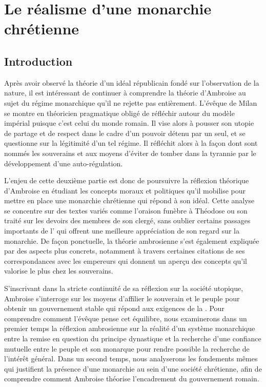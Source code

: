 \section{Le réalisme d'une monarchie chrétienne}

\subsection*{Introduction}

Après avoir observé la théorie d'un idéal républicain fondé sur l'observation de la nature, il est intéressant de continuer à comprendre la théorie d'Ambroise au sujet du régime monarchique qu'il ne rejette pas entièrement. L'évêque de Milan se montre en théoricien pragmatique obligé de réfléchir autour du modèle impérial puisque c'est celui du monde romain. Il vise alors à pousser son utopie de partage et de respect dans le cadre d'un pouvoir détenu par un seul, et se questionne sur la légitimité d'un tel régime. Il réfléchit alors à la façon dont sont nommés les souverains et aux moyens d'éviter de tomber dans la tyrannie par le développement d'une auto-régulation.

\bigskip

L'enjeu de cette deuxième partie est donc de poursuivre la réflexion théorique d'Ambroise en étudiant les concepts moraux et politiques qu'il mobilise pour mettre en place une monarchie chrétienne qui répond à son idéal. Cette analyse se concentre sur des textes variés comme l'oraison funèbre à Théodose ou son traité  sur les devoirs des membres de son clergé, sans oublier certains passages importants de l' qui offrent une meilleure appréciation de son regard sur la monarchie. De façon ponctuelle, la théorie ambrosienne s'est également expliquée par des aspects plus concrets, notamment à travers certaines citations de ses correspondances avec les empereurs qui donnent un aperçu des concepts qu'il valorise le plus chez les souverains.

\bigskip

S'inscrivant dans la stricte continuité de sa réflexion sur la société utopique, Ambroise s'interroge sur les moyens d'affilier le souverain et le peuple pour obtenir un gouvernement stable qui répond aux exigences de la . Pour comprendre comment l'évêque pense cet équilibre, nous examinerons dans un premier temps la réflexion ambrosienne sur la réalité d'un système monarchique entre la remise en question du principe dynastique et la recherche d'une confiance mutuelle entre le peuple et son monarque pour rendre possible la recherche de l'intérêt général. Dans un second temps, nous analyserons les fondements mêmes qui justifient la présence d'une monarchie au sein d'une société chrétienne, afin de comprendre comment Ambroise théorise l'encadrement du gouvernement romain.

